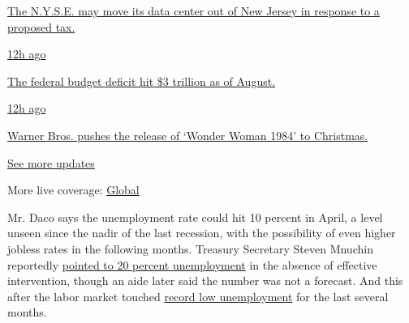 \href{https://www.nytimes3xbfgragh.onion/live/2020/09/11/business/stock-market-today-coronavirus?action=click\&pgtype=Article\&state=default\&region=MAIN_CONTENT_1\&context=storylines_live_updates\#the-nyse-may-move-its-data-center-out-of-new-jersey-in-response-to-a-proposed-tax}{The
N.Y.S.E. may move its data center out of New Jersey in response to a
proposed tax.}

\href{https://www.nytimes3xbfgragh.onion/live/2020/09/11/business/stock-market-today-coronavirus?action=click\&pgtype=Article\&state=default\&region=MAIN_CONTENT_1\&context=storylines_live_updates\#the-federal-budget-deficit-hit-3-trillion-as-of-august}{12h
ago}

\href{https://www.nytimes3xbfgragh.onion/live/2020/09/11/business/stock-market-today-coronavirus?action=click\&pgtype=Article\&state=default\&region=MAIN_CONTENT_1\&context=storylines_live_updates\#the-federal-budget-deficit-hit-3-trillion-as-of-august}{The
federal budget deficit hit \$3 trillion as of August.}

\href{https://www.nytimes3xbfgragh.onion/live/2020/09/11/business/stock-market-today-coronavirus?action=click\&pgtype=Article\&state=default\&region=MAIN_CONTENT_1\&context=storylines_live_updates\#warner-bros-pushes-the-release-of-wonder-woman-1984-to-christmas}{12h
ago}

\href{https://www.nytimes3xbfgragh.onion/live/2020/09/11/business/stock-market-today-coronavirus?action=click\&pgtype=Article\&state=default\&region=MAIN_CONTENT_1\&context=storylines_live_updates\#warner-bros-pushes-the-release-of-wonder-woman-1984-to-christmas}{Warner
Bros. pushes the release of `Wonder Woman 1984' to Christmas.}

\href{https://www.nytimes3xbfgragh.onion/live/2020/09/11/business/stock-market-today-coronavirus?action=click\&pgtype=Article\&state=default\&region=MAIN_CONTENT_1\&context=storylines_live_updates}{See
more updates}

More live coverage:
\href{https://www.nytimes3xbfgragh.onion/2020/09/11/world/covid-19-coronavirus.html?action=click\&pgtype=Article\&state=default\&region=MAIN_CONTENT_1\&context=storylines_live_updates}{Global}

Mr. Daco says the unemployment rate could hit 10 percent in April, a
level unseen since the nadir of the last recession, with the possibility
of even higher jobless rates in the following months. Treasury Secretary
Steven Mnuchin reportedly
\href{https://www.nytimes3xbfgragh.onion/2020/03/17/us/politics/stimulus-package.html}{pointed
to 20 percent unemployment} in the absence of effective intervention,
though an aide later said the number was not a forecast. And this after
the labor market touched
\href{https://www.nytimes3xbfgragh.onion/2020/03/06/business/economy/jobs-report.html}{record
low unemployment} for the last several months.

